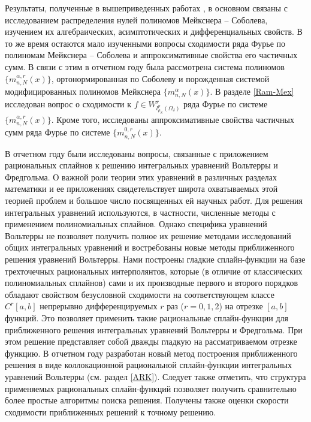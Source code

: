 Результаты, полученные в вышеприведенных работах \cite{Ram-Shar-VMJ,Ram-Ar-Go-Mar,Ram-Kh-Old,Ram-Bav1,Ram-Bav2,Ram-Shar-Sar,Ram-Mor-Bal,Ram-Co-So-Vil}, в основном связаны с исследованием распределения нулей полиномов Мейкснера --  Соболева, изучением их алгебраических, асимптотических и дифференциальных свойств. В то же время остаются мало изученными вопросы сходимости ряда Фурье по полиномам Мейкснера -- Соболева и аппроксимативные свойства его частичных сумм. В связи с этим в отчетном году была рассмотрена система полиномов $\{m_{n,N}^{\alpha,r}(x)\}$, ортонормированная по Соболеву и порожденная системой модифицированных полиномов Мейкснера $\{m_{n,N}^{\alpha}(x)\}$. В разделе \ref{Ram-Mex} исследован вопрос о сходимости к $f\in W^r_{l^p_{\rho_N}(\Omega_\delta)}$ ряда Фурье по системе $\{m_{n,N}^{\alpha,r}(x)\}$. Кроме того, исследованы аппроксимативные свойства частичных сумм ряда Фурье по системе $\{m_{n,N}^{0,r}(x)\}$.

В отчетном году были исследованы вопросы, связанные с приложением рациональных сплайнов к решению интегральных уравнений Вольтерры и Фредгольма. О важной роли теории этих уравнений в различных разделах математики и ее приложениях свидетельствует широта охватываемых этой теорией проблем и большое число посвященных ей научных работ. Для решения интегральных уравнений используются, в частности, численные методы с применением полиномиальных сплайнов. Однако специфика уравнений Вольтерры не позволяет получить полное их решение методами исследований общих интегральных уравнений и востребованы новые методы приближенного решения уравнений Вольтерры.
Нами построены гладкие сплайн-функции на базе трехточечных рациональных
интерполянтов, которые (в отличие от классических полиномиальных сплайнов)
сами и их производные первого и второго
порядков обладают свойством безусловной сходимости
на соответствующем классе $C^r[a,b]$ непрерывно дифференцируемых $r$ раз
($r=0,1,2$) на отрезке $[a,b]$ функций.
Это позволяет применить такие рациональные сплайн-функции для приближенного
решения интегральных уравнений Вольтерры и Фредгольма.
При этом решение представляет собой дважды гладкую на рассматриваемом отрезке
функцию.
В отчетном году разработан новый метод построения приближенного решения в виде коллокационной рациональной сплайн-функции
интегральных уравнений Вольтерры (см. раздел \ref{ARK}). Следует также отметить, что структура применяемых рациональных сплайн-функций
позволяет получить сравнительно более простые алгоритмы поиска решения. Получены также оценки скорости сходимости приближенных решений к точному решению.

